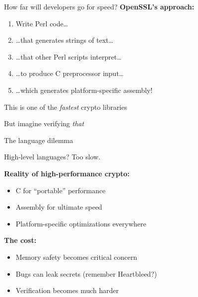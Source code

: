 \documentclass[aspectratio=169, lualatex, handout]{beamer}
\begin{document}
\begin{frame}{How far will developers go for speed?}
	\textbf{OpenSSL's approach:}
	\begin{enumerate}
		\item Write Perl code\ldots
		\item \ldots that generates strings of text\ldots
		\item \ldots that other Perl scripts interpret\ldots
		\item \ldots to produce C preprocessor input\ldots
		\item \ldots which generates platform-specific assembly!
	\end{enumerate}
	\vspace{1em}
	\begin{center}
		\Large
		This is one of the \textit{fastest} crypto libraries

		\vspace{0.5em}

		\normalsize
		But imagine verifying \textit{that}
	\end{center}
\end{frame}

\begin{frame}{The language dilemma}
	\begin{center}
		\Large
		High-level languages? Too slow.
	\end{center}
	\vspace{1em}
	\textbf{Reality of high-performance crypto:}
	\begin{itemize}
		\item C for ``portable'' performance
		\item Assembly for ultimate speed
		\item Platform-specific optimizations everywhere
	\end{itemize}
	\vspace{0.5em}
	\textbf{The cost:}
	\begin{itemize}
		\item Memory safety becomes critical concern
		\item Bugs can leak secrets (remember Heartbleed?)
		\item Verification becomes much harder
	\end{itemize}
\end{frame}
\end{document}
